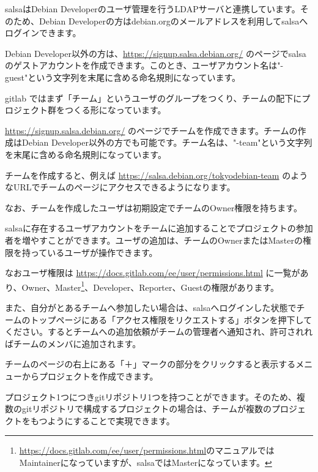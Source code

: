 \documentclass[mingoth,a4paper]{jsarticle}
\begin{document}

salsaはDebian Developerのユーザ管理を行うLDAPサーバと連携しています。そのため、Debian Developerの方はdebian.orgのメールアドレスを利用してsalsaへログインできます。


Debian Developer以外の方は、\url{https://signup.salsa.debian.org/} のページでsalsaのゲストアカウントを作成できます。このとき、ユーザアカウント名は"-guest"という文字列を末尾に含める命名規則になっています。



gitlab ではまず「チーム」というユーザのグループをつくり、チームの配下にプロジェクト群をつくる形になっています。

\url{https://signup.salsa.debian.org/} のページでチームを作成できます。チームの作成はDebian Developer以外の方でも可能です。チーム名は、"-team"という文字列を末尾に含める命名規則になっています。

チームを作成すると、例えば \url{https://salsa.debian.org/tokyodebian-team} のようなURLでチームのページにアクセスできるようになります。

なお、チームを作成したユーザは初期設定でチームのOwner権限を持ちます。



salsaに存在するユーザアカウントをチームに追加することでプロジェクトの参加者を増やすことができます。ユーザの追加は、チームのOwnerまたはMasterの権限を持っているユーザが操作できます。

なおユーザ権限は \url{https://docs.gitlab.com/ee/user/permissions.html} に一覧があり、Owner、Master\footnote{\url{https://docs.gitlab.com/ee/user/permissions.html}のマニュアルではMaintainerになっていますが、salsaではMasterになっています。}、Developer、Reporter、Guestの権限があります。

また、自分がとあるチームへ参加したい場合は、salsaへログインした状態でチームのトップページにある「アクセス権限をリクエストする」ボタンを押下してください。するとチームへの追加依頼がチームの管理者へ通知され、許可されればチームのメンバに追加されます。



チームのページの右上にある「＋」マークの部分をクリックすると表示するメニューからプロジェクトを作成できます。

プロジェクト1つにつきgitリポジトリ1つを持つことができます。そのため、複数のgitリポジトリで構成するプロジェクトの場合は、チームが複数のプロジェクトをもつようにすることで実現できます。
\end{document}
